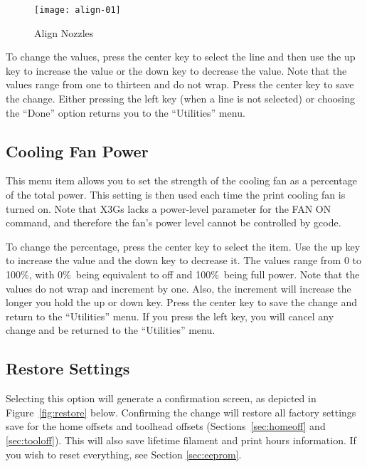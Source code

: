 \begin{figure}[!htbp]
  \centering
    \texttt{[image: align-01]}
    \caption{Align Nozzles}
  \label{fig:alignnozzles}
\end{figure}

To change the values, press the center key to select the line and then use the up key to increase the value or the down key to decrease the value.  Note that the values range from one to thirteen and do not wrap.  Press the center key to save the change.  Either pressing the left key (when a line is not selected) or choosing the ``Done'' option returns you to the ``Utilities'' menu.


\subsection{Cooling Fan Power} \label{sec:cfanpower}

This menu item allows you to set the strength of the cooling fan as a percentage of the total power. This setting is then used each time the print cooling fan is turned on.  Note that \glspl{X3G} lacks a power-level parameter for the FAN ON command, and therefore the fan's power level cannot be controlled by gcode.

To change the percentage, press the center key to select the item.  Use the up key to increase the value and the down key to decrease it.  The values range from 0 to 100\%, with 0\%\, being equivalent to off and 100\%\, being full power.  Note that the values do not wrap and increment by one. Also, the increment will increase the longer you hold the up or down key.  Press the center key to save the change and return to the ``Utilities'' menu. If you press the left key, you will cancel any change and be returned to the ``Utilities'' menu.


\subsection{Restore Settings} \label{sec:restore-settings}

Selecting this option will generate a confirmation screen, as depicted in Figure~\ref{fig:restore} below.  Confirming the change will restore all factory settings save for the home offsets and toolhead offsets (Sections~\ref{sec:homeoff} and \ref{sec:tooloff}).  This will also save lifetime filament and print hours information.  If you wish to reset everything, see Section \ref{sec:eeprom}.


